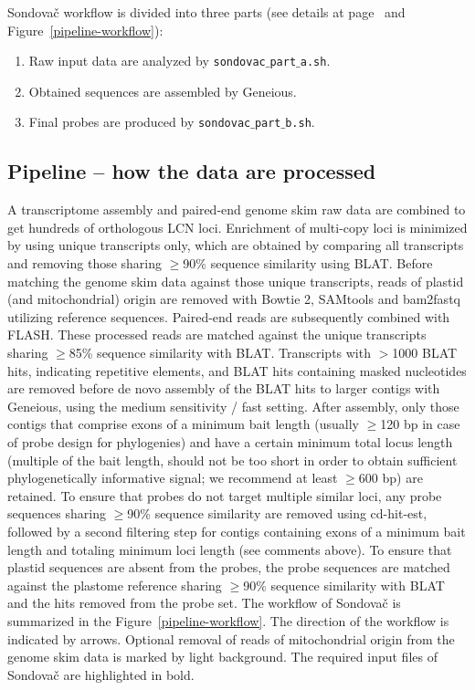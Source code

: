 \documentclass[a4paper, 11pt, twoside]{article}
\begin{document}
Sondovač workflow is divided into three parts (see details at page~\pageref{pipeline-overview} and Figure~\ref{pipeline-workflow}):

\begin{enumerate}
\item Raw input data are analyzed by \texttt{sondovac$\_$part$\_$a.sh}.
\item Obtained sequences are assembled by Geneious.
\item Final probes are produced by \texttt{sondovac$\_$part$\_$b.sh}.
\end{enumerate}

\subsection{Pipeline -- how the data are processed}

A transcriptome assembly and paired-end genome skim raw data are combined to get hundreds of orthologous LCN loci. Enrichment of multi-copy loci is minimized by using unique transcripts only, which are obtained by comparing all transcripts and removing those sharing $\geq$90\% sequence similarity using BLAT. Before matching the genome skim data against those unique transcripts, reads of plastid (and mitochondrial) origin are removed with Bowtie 2, SAMtools and bam2fastq utilizing reference sequences. Paired-end reads are subsequently combined with FLASH. These processed reads are matched against the unique transcripts sharing $\geq$85\% sequence similarity with BLAT. Transcripts with $>$1000 BLAT hits, indicating repetitive elements, and BLAT hits containing masked nucleotides are removed before de novo assembly of the BLAT hits to larger contigs with Geneious, using the medium sensitivity / fast setting. After assembly, only those contigs that comprise exons of a minimum bait length (usually $\geq$120 bp in case of probe design for phylogenies) and have a certain minimum total locus length (multiple of the bait length, should not be too short in order to obtain sufficient phylogenetically informative signal; we recommend at least $\geq$600 bp) are retained. To ensure that probes do not target multiple similar loci, any probe sequences sharing $\geq$90\% sequence similarity are removed using cd-hit-est, followed by a second filtering step for contigs containing exons of a minimum bait length and totaling minimum loci length (see comments above). To ensure that plastid sequences are absent from the probes, the probe sequences are matched against the plastome reference sharing $\geq$90\% sequence similarity with BLAT and the hits removed from the probe set. The workflow of Sondovač is summarized in the Figure~\ref{pipeline-workflow}. The direction of the workflow is indicated by arrows. Optional removal of reads of mitochondrial origin from the genome skim data is marked by light background. The required input files of Sondovač are highlighted in bold.
\end{document}
